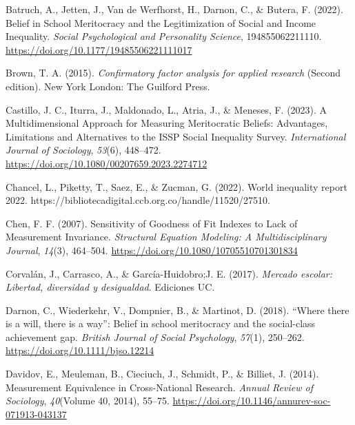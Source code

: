 \documentclass[
  12pt,
]{article}
\newlength{\cslhangindent}
\newenvironment{CSLReferences}[2] %
 {\begin{list}{}{%
  \setlength{\itemindent}{0pt}
  \setlength{\leftmargin}{0pt}
  \setlength{\parsep}{0pt}
  \ifodd #1
   \setlength{\leftmargin}{\cslhangindent}
   \setlength{\itemindent}{-1\cslhangindent}
  \fi
  \setlength{\itemsep}{#2\baselineskip}}}
 {\end{list}}
\begin{document}
\label{refs}
\begin{CSLReferences}{1}{0}
Batruch, A., Jetten, J., Van de Werfhorst, H., Darnon, C., \& Butera, F.
(2022). Belief in {School Meritocracy} and the {Legitimization} of
{Social} and {Income Inequality}. \emph{Social Psychological and
Personality Science}, 194855062211110.
\url{https://doi.org/10.1177/19485506221111017}

Brown, T. A. (2015). \emph{Confirmatory factor analysis for applied
research} (Second edition). New York London: The Guilford Press.

Castillo, J. C., Iturra, J., Maldonado, L., Atria, J., \& Meneses, F.
(2023). A {Multidimensional Approach} for {Measuring Meritocratic
Beliefs}: {Advantages}, {Limitations} and {Alternatives} to the {ISSP
Social Inequality Survey}. \emph{International Journal of Sociology},
\emph{53}(6), 448--472.
\url{https://doi.org/10.1080/00207659.2023.2274712}

Chancel, L., Piketty, T., Saez, E., \& Zucman, G. (2022). World
inequality report 2022.
https://bibliotecadigital.ccb.org.co/handle/11520/27510.

Chen, F. F. (2007). Sensitivity of {Goodness} of {Fit Indexes} to {Lack}
of {Measurement Invariance}. \emph{Structural Equation Modeling: A
Multidisciplinary Journal}, \emph{14}(3), 464--504.
\url{https://doi.org/10.1080/10705510701301834}

Corvalán, J., Carrasco, A., \& García-Huidobro;J. E. (2017).
\emph{Mercado escolar: {Libertad}, diversidad y desigualdad}. Ediciones
UC.

Darnon, C., Wiederkehr, V., Dompnier, B., \& Martinot, D. (2018).
{``{Where} there is a will, there is a way''}: {Belief} in school
meritocracy and the social-class achievement gap. \emph{British Journal
of Social Psychology}, \emph{57}(1), 250--262.
\url{https://doi.org/10.1111/bjso.12214}

Davidov, E., Meuleman, B., Cieciuch, J., Schmidt, P., \& Billiet, J.
(2014). Measurement {Equivalence} in {Cross-National Research}.
\emph{Annual Review of Sociology}, \emph{40}(Volume 40, 2014), 55--75.
\url{https://doi.org/10.1146/annurev-soc-071913-043137}


\end{CSLReferences}
\end{document}
